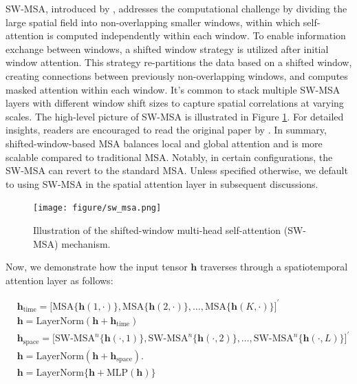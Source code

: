 \documentclass[11pt]{article}
\begin{document}
SW-MSA, introduced by \citet{liu2021swin}, addresses the computational challenge by dividing the large spatial field into non-overlapping smaller windows, within which self-attention is computed independently within each window. To enable information exchange between windows, a shifted window strategy is utilized after initial window attention. This strategy re-partitions the data based on a shifted window, creating connections between previously non-overlapping windows, and computes masked attention within each window. It's common to stack multiple SW-MSA layers with different window shift sizes to capture spatial correlations at varying scales. The high-level picture of SW-MSA is illustrated in Figure \ref{fig: sw_msa}. For detailed insights, readers are encouraged to read the original paper by \citet{liu2021swin}. In summary, shifted-window-based MSA balances local and global attention and is more scalable compared to traditional MSA. Notably, in certain configurations, the SW-MSA can revert to the standard MSA. Unless specified otherwise, we default to using SW-MSA in the spatial attention layer in subsequent discussions.



\begin{figure}[H]
\centering
\texttt{[image: figure/sw\_msa.png]}
\caption{Illustration of the shifted-window multi-head self-attention (SW-MSA) mechanism.}
\label{fig: sw_msa}
\end{figure}




Now, we demonstrate how the input tensor $\boldsymbol{h}$ traverses through a spatiotemporal attention layer as follows:



\begin{align}
		&\boldsymbol{h}_{\text{time}} = \big[\text{MSA}\{\boldsymbol{h}(1,\cdot)\}, \text{MSA}\{\boldsymbol{h}(2,\cdot)\}, \ldots, \text{MSA}\{\boldsymbol{h}(K,\cdot)\}\big]^{\prime}\\
		&\boldsymbol{h}= \text{LayerNorm}(\boldsymbol{h}+ \boldsymbol{h}_{\text{time}})\\
		&\boldsymbol{h}_{\text{space}} = \big[\text{SW-MSA}^n\{\boldsymbol{h}(\cdot, 1)\}, \text{SW-MSA}^n\{\boldsymbol{h}(\cdot, 2)\}, \ldots, \text{SW-MSA}^n\{\boldsymbol{h}(\cdot, L)\}\big]^{\prime}\\
		&\boldsymbol{h}= \text{LayerNorm}(\boldsymbol{h}+ \boldsymbol{h}_{\text{space}}).\\
		& \boldsymbol{h} = \text{LayerNorm}\{\boldsymbol{h} + \text{MLP}(\boldsymbol{h})\}\\
\end{align}
\end{document}
